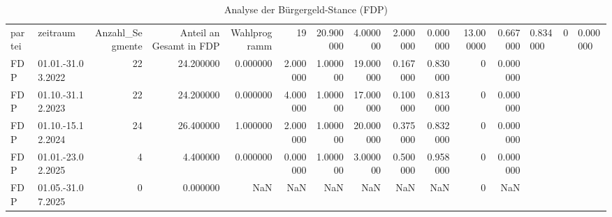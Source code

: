 \begin{table}
\caption{Analyse der Bürgergeld-Stance (FDP)}
\label{tab:meine_tabelle}
\begin{tabular}{llrrrrrrrrrr}
\toprule
partei & zeitraum & Anzahl_Segmente & Anteil an Gesamt in %
\midrule
FDP & Wahlprogramm & 19 & 20.900000 & 4.000000 & 2.000000 & 0.000000 & 13.000000 & 0.667000 & 0.834000 & 0 & 0.000000 \\
FDP & 01.01.-31.03.2022 & 22 & 24.200000 & 0.000000 & 2.000000 & 1.000000 & 19.000000 & 0.167000 & 0.830000 & 0 & 0.000000 \\
FDP & 01.10.-31.12.2023 & 22 & 24.200000 & 0.000000 & 4.000000 & 1.000000 & 17.000000 & 0.100000 & 0.813000 & 0 & 0.000000 \\
FDP & 01.10.-15.12.2024 & 24 & 26.400000 & 1.000000 & 2.000000 & 1.000000 & 20.000000 & 0.375000 & 0.832000 & 0 & 0.000000 \\
FDP & 01.01.-23.02.2025 & 4 & 4.400000 & 0.000000 & 0.000000 & 1.000000 & 3.000000 & 0.500000 & 0.958000 & 0 & 0.000000 \\
FDP & 01.05.-31.07.2025 & 0 & 0.000000 & NaN & NaN & NaN & NaN & NaN & NaN & 0 & NaN \\
\bottomrule
\end{tabular}
\end{table}
